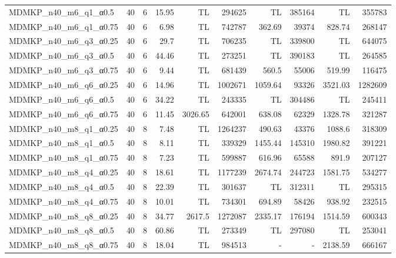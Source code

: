 \begin{center}
\begin{scriptsize}
\begin{longtable}{lrrrrrrrrr}
MDMKP\_n40\_m6\_q1\_α0.5 & 40 & 6 & 15.95 &  TL & 294625 &  TL & 385164 &  TL & 355783\\
MDMKP\_n40\_m6\_q1\_α0.75 & 40 & 6 & 6.98 &  TL & 742787 & 362.69 & 39374 & 828.74 & 268147\\
MDMKP\_n40\_m6\_q3\_α0.25 & 40 & 6 & 29.7 &  TL & 706235 &  TL & 339800 &  TL & 644075\\
MDMKP\_n40\_m6\_q3\_α0.5 & 40 & 6 & 44.46 &  TL & 273251 &  TL & 390183 &  TL & 264585\\
MDMKP\_n40\_m6\_q3\_α0.75 & 40 & 6 & 9.44 &  TL & 681439 & 560.5 & 55006 & 519.99 & 116475\\
MDMKP\_n40\_m6\_q6\_α0.25 & 40 & 6 & 14.96 &  TL & 1002671 & 1059.64 & 93326 & 3521.03 & 1282609\\
MDMKP\_n40\_m6\_q6\_α0.5 & 40 & 6 & 34.22 &  TL & 243335 &  TL & 304486 &  TL & 245411\\
MDMKP\_n40\_m6\_q6\_α0.75 & 40 & 6 & 11.45 & 3026.65 & 642001 & 638.08 & 62329 & 1328.78 & 321287\\
MDMKP\_n40\_m8\_q1\_α0.25 & 40 & 8 & 7.48 &  TL & 1264237 & 490.63 & 43376 & 1088.6 & 318309\\
MDMKP\_n40\_m8\_q1\_α0.5 & 40 & 8 & 8.11 &  TL & 339329 & 1455.44 & 145310 & 1980.82 & 391221\\
MDMKP\_n40\_m8\_q1\_α0.75 & 40 & 8 & 7.23 &  TL & 599887 & 616.96 & 65588 & 891.9 & 207127\\
MDMKP\_n40\_m8\_q4\_α0.25 & 40 & 8 & 18.61 &  TL & 1177239 & 2674.74 & 244723 & 1581.75 & 534277\\
MDMKP\_n40\_m8\_q4\_α0.5 & 40 & 8 & 22.39 &  TL & 301637 &  TL & 312311 &  TL & 295315\\
MDMKP\_n40\_m8\_q4\_α0.75 & 40 & 8 & 10.01 &  TL & 734301 & 694.89 & 58426 & 938.92 & 232515\\
MDMKP\_n40\_m8\_q8\_α0.25 & 40 & 8 & 34.77 & 2617.5 & 1272087 & 2335.17 & 176194 & 1514.59 & 600343\\
MDMKP\_n40\_m8\_q8\_α0.5 & 40 & 8 & 60.86 &  TL & 273349 &  TL & 297080 &  TL & 253041\\
MDMKP\_n40\_m8\_q8\_α0.75 & 40 & 8 & 18.04 &  TL & 984513 &  - & - & 2138.59 & 666167\\
\bottomrule
\end{longtable}
\end{scriptsize}
\end{center}

